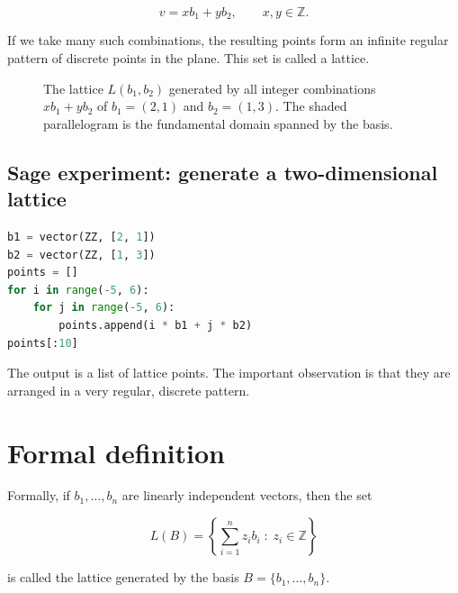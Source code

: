 \[
v = x b_1 + y b_2, \qquad x,y \in \mathbb{Z}.
\]

If we take many such combinations, the resulting points form an infinite regular pattern of discrete points in the plane. This set is called a lattice.

\begin{figure}[H]
\centering
{}
\caption{The lattice $L(b_1,b_2)$ generated by all integer combinations $xb_1+yb_2$ of $b_1=(2,1)$ and $b_2=(1,3)$. The shaded parallelogram is the fundamental domain spanned by the basis.}
\label{fig:lattice-basic}
\end{figure}

\subsection{Sage experiment: generate a two-dimensional lattice}

\begin{lstlisting}[language=Python]
b1 = vector(ZZ, [2, 1])
b2 = vector(ZZ, [1, 3])
points = []
for i in range(-5, 6):
    for j in range(-5, 6):
        points.append(i * b1 + j * b2)
points[:10]
\end{lstlisting}

The output is a list of lattice points. The important observation is that they are arranged in a very regular, discrete pattern.

\section{Formal definition}
Formally, if $b_1, \ldots, b_n$ are linearly independent vectors, then the set

\[
L(B) = \left\{ \sum_{i=1}^{n} z_i b_i \;:\; z_i \in \mathbb{Z} \right\}
\]

is called the lattice generated by the basis $B = \{b_1, \ldots, b_n\}$.

